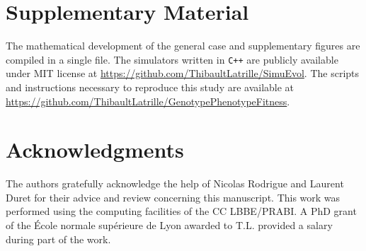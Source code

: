 \documentclass[a4paper]{MBE}
\begin{document}
\maketitle




\section{Supplementary Material}
The mathematical development of the general case and supplementary figures are compiled in a single file.
The simulators written in \texttt{C++} are publicly available under MIT license at \url{https://github.com/ThibaultLatrille/SimuEvol}.
The scripts and instructions necessary to reproduce this study are available at \url{https://github.com/ThibaultLatrille/GenotypePhenotypeFitness}.

\section{Acknowledgments}

The authors gratefully acknowledge the help of Nicolas Rodrigue and Laurent Duret for their advice and review concerning this manuscript.
This work was performed using the computing facilities of the CC LBBE/PRABI.
A PhD grant of the École normale supérieure de Lyon awarded to T.L.
provided a salary during part of the work.


\end{document}
